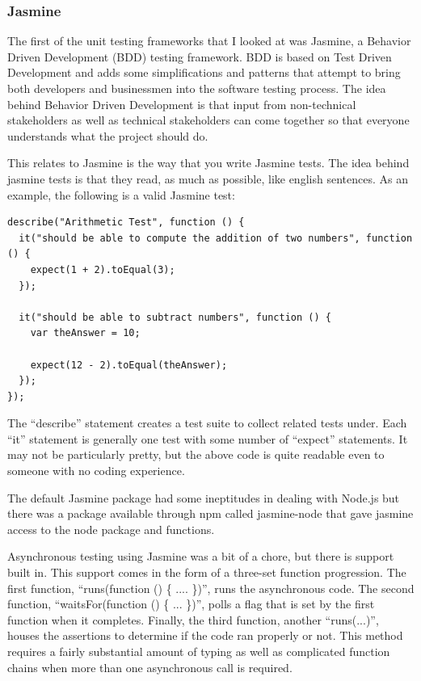 \documentclass[11pt]{article}
\begin{document}
\subsubsection{Jasmine \cite{Jasmine}}
The first of the unit testing frameworks that I looked at was Jasmine, a Behavior Driven Development (BDD) testing framework. BDD is based on Test Driven Development and adds some simplifications and patterns that attempt to bring both developers and businessmen into the software testing process. The idea behind Behavior Driven Development is that input from non-technical stakeholders as well as technical stakeholders can come together so that everyone understands what the project should do.

This relates to Jasmine is the way that you write Jasmine tests. The idea behind jasmine tests is that they read, as much as possible, like english sentences. As an example, the following is a valid Jasmine test:
\begin{lstlisting}
describe("Arithmetic Test", function () {
  it("should be able to compute the addition of two numbers", function () {
    expect(1 + 2).toEqual(3);
  });

  it("should be able to subtract numbers", function () {
    var theAnswer = 10;

    expect(12 - 2).toEqual(theAnswer);
  });
});
\end{lstlisting}
The ``describe'' statement creates a test suite to collect related tests under. Each ``it'' statement is generally one test with some number of ``expect'' statements. It may not be particularly pretty, but the above code is quite readable even to someone with no coding experience.

The default Jasmine package had some ineptitudes in dealing with Node.js but there was a package available through npm called jasmine-node \cite{JasmineNode} that gave jasmine access to the node package and functions. 

Asynchronous testing using Jasmine was a bit of a chore, but there is support built in. This support comes in the form of a three-set function progression. The first function, ``runs(function () \{ .... \})'', runs the asynchronous code. The second function, ``waitsFor(function () \{ ... \})'', polls a flag that is set by the first function when it completes. Finally, the third function, another ``runs(...)'', houses the assertions to determine if the code ran properly or not. This method requires a fairly substantial amount of typing as well as complicated function chains when more than one asynchronous call is required.
\end{document}

